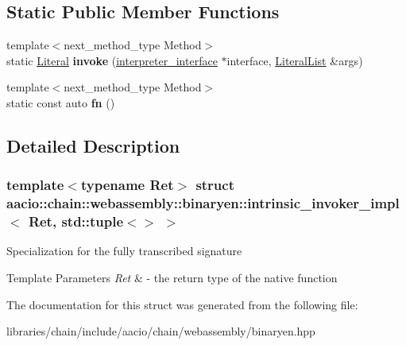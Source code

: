 \subsection*{Static Public Member Functions}
\begin{DoxyCompactItemize}
\item 
\mbox{\label{structaacio_1_1chain_1_1webassembly_1_1binaryen_1_1intrinsic__invoker__impl_3_01_ret_00_01std_1_1tuple_3_4_01_4_a4b40832c5462e7d25ca322dec1fcd218}} 
{\footnotesize template$<$next\+\_\+method\+\_\+type Method$>$ }\\static \mbox{\hyperlink{classwasm_1_1_literal}{Literal}} {\bfseries invoke} (\mbox{\hyperlink{structaacio_1_1chain_1_1webassembly_1_1binaryen_1_1interpreter__interface}{interpreter\+\_\+interface}} $\ast$interface, \mbox{\hyperlink{classstd_1_1vector}{Literal\+List}} \&args)
\item 
\mbox{\label{structaacio_1_1chain_1_1webassembly_1_1binaryen_1_1intrinsic__invoker__impl_3_01_ret_00_01std_1_1tuple_3_4_01_4_afdb09befb39bafebd73740f85893e7f5}} 
{\footnotesize template$<$next\+\_\+method\+\_\+type Method$>$ }\\static const auto {\bfseries fn} ()
\end{DoxyCompactItemize}


\subsection{Detailed Description}
\subsubsection*{template$<$typename Ret$>$\newline
struct aacio\+::chain\+::webassembly\+::binaryen\+::intrinsic\+\_\+invoker\+\_\+impl$<$ Ret, std\+::tuple$<$$>$ $>$}

Specialization for the fully transcribed signature 
\begin{DoxyTemplParams}{Template Parameters}
{\em Ret} & -\/ the return type of the native function \\
\hline
\end{DoxyTemplParams}


The documentation for this struct was generated from the following file\+:\begin{DoxyCompactItemize}
\item 
libraries/chain/include/aacio/chain/webassembly/binaryen.\+hpp\end{DoxyCompactItemize}
